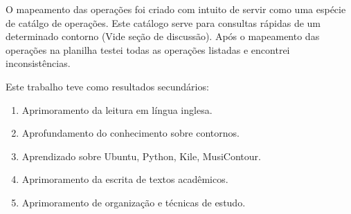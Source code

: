 \documentclass[11pt]{article}
\begin{document}
\label{sec:resultados}




O mapeamento das operações foi criado com intuito de servir como uma
espécie de catálgo de operações. Este catálogo serve para consultas
rápidas de um determinado contorno (Vide seção de discussão).
Após o mapeamento das operações na planilha testei todas as operações
listadas e encontrei inconsistências.

Este trabalho teve como resultados secundários:

\begin{enumerate}
\item Aprimoramento da leitura em língua inglesa.
\item Aprofundamento do conhecimento sobre contornos.
\item Aprendizado sobre Ubuntu, Python, Kile, MusiContour.
\item Aprimoramento da escrita de textos acadêmicos.
\item Aprimoramento de organização e técnicas de estudo.
\end{enumerate}

\label{sec:discussao}

\end{document}
